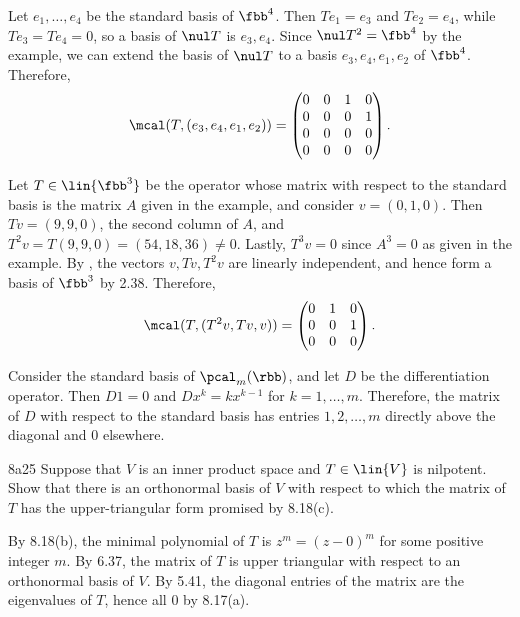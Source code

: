 \begin{solenum}
    \item Let $e_1, \ldots, e_4$ be the standard basis of $\fbb^4$.
    Then $T e_1 = e_3$ and $T e_2 = e_4$, while $T e_3 = T e_4 = 0$, so a basis of $\nul T$ is $e_3, e_4$.
    Since $\nul T^2 = \fbb^4$ by the example, we can extend the basis of $\nul T$ to a basis $e_3, e_4, e_1, e_2$ of $\fbb^4$.
    Therefore,
    \[
        \mcal(T, (e_3, e_4, e_1, e_2)) = 
        \begin{pmatrix}
            0 & 0 & 1 & 0 \\
            0 & 0 & 0 & 1 \\
            0 & 0 & 0 & 0 \\
            0 & 0 & 0 & 0
        \end{pmatrix}.
    \]
    \item Let $T \in \lin{\fbb^3}$ be the operator whose matrix with respect to the standard basis is the matrix $A$ given in the example, and consider $v = (0, 1, 0)$.
    Then $Tv = (9, 9, 0)$, the second column of $A$, and $T^2 v = T(9, 9, 0) = (54, 18, 36) \neq 0$.
    Lastly, $T^3v = 0$ since $A^3 = 0$ as given in the example.
    By , the vectors $v, Tv, T^2v$ are linearly independent, and hence form a basis of $\fbb^3$ by 2.38.
    Therefore,
    \[
        \mcal(T, (T^2v, Tv, v)) = 
        \begin{pmatrix}
            0 & 1 & 0 \\
            0 & 0 & 1 \\
            0 & 0 & 0
        \end{pmatrix}.
    \]
    \item Consider the standard basis of $\pcal_m(\rbb)$, and let $D$ be the differentiation operator.
    Then $D 1 = 0$ and $D x^k = k x^{k-1}$ for $k = 1, \ldots, m$.
    Therefore, the matrix of $D$ with respect to the standard basis has entries $1, 2, \ldots, m$ directly above the diagonal and $0$ elsewhere.
\end{solenum}

\begin{exercise}{8a25}
    Suppose that $V$ is an inner product space and $T \in \lin{V}$ is nilpotent.
    Show that there is an orthonormal basis of $V$ with respect to which the matrix of $T$ has the upper-triangular form promised by 8.18(c).
\end{exercise}

\begin{sol}
    By 8.18(b), the minimal polynomial of $T$ is $z^m = (z - 0)^m$ for some positive integer $m$.
    By 6.37, the matrix of $T$ is upper triangular with respect to an orthonormal basis of $V$.
    By 5.41, the diagonal entries of the matrix are the eigenvalues of $T$, hence all $0$ by 8.17(a).
\end{sol}